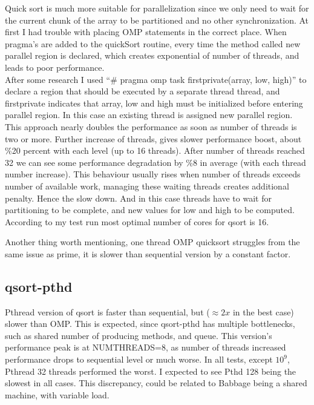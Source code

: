 \documentclass{article}
\begin{document}
Quick sort is much more suitable for parallelization since we only need to wait for the
current chunk of the array to be partitioned and no other synchronization. At first I had
trouble with placing OMP statements in the correct place. When pragma's are added to the
quickSort routine, every time the method called new parallel region is declared, which
creates exponential of number of threads, and leads to poor performance. \\

After some research I used ``\# pragma omp task firstprivate(array, low, high)'' to declare a
region that should be executed by a separate thread thread, and firstprivate indicates that 
array, low and high must be initialized before entering parallel region. In this case an
existing thread is assigned new parallel region. \\

This approach nearly doubles the performance as soon as number of threads is two or more.
Further increase of threads, gives slower performance boost, about \%20 percent with each
level (up to 16 threads). After number of threads reached 32 we can see some performance
degradation by \%8 in average (with each thread number increase). 
This behaviour usually rises when number of threads exceeds number of available work,
managing these waiting threads creates additional penalty. Hence the slow down. And in 
this case threads have to wait for partitioning to be complete, and new values for low and
high to be computed. According to my test run most optimal number of cores for qsort is 16.

Another thing worth mentioning, one thread OMP quicksort struggles from the same issue as 
prime, it is slower than sequential version by a constant factor.

\subsection{\textbf{qsort-pthd}}

Pthread version of qsort is faster than sequential, but ($\approx 2x$ in the best case) slower 
than OMP. This is expected, since qsort-pthd has multiple bottlenecks, such as shared number
of producing methods, and queue. This version's performance peak is at NUMTHREADS=8, as
number of threads increased performance drops to sequential level or much worse. 
In all tests, except $10^9$, Pthread 32 threads performed the worst. I expected to see Pthd
128 being the slowest in all cases.  This discrepancy, could be related to Babbage
being a shared machine, with variable load.
\end{document}
